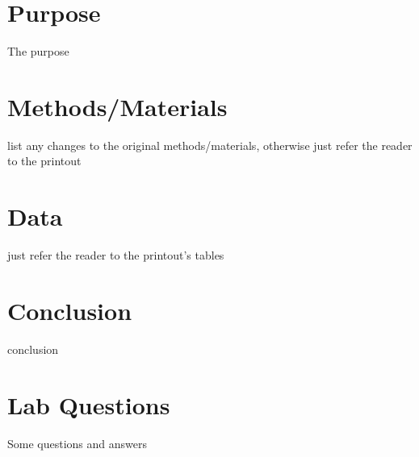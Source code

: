 \documentclass{article}
\begin{document}

\section{Purpose}

	The purpose

\section{Methods/Materials}

	list any changes to the original methods/materials, otherwise just refer the reader to the printout

\section{Data}

	just refer the reader to the printout's tables
\section{Conclusion}

	conclusion

\newpage

\section{Lab Questions}

Some questions and answers
\end{document}

